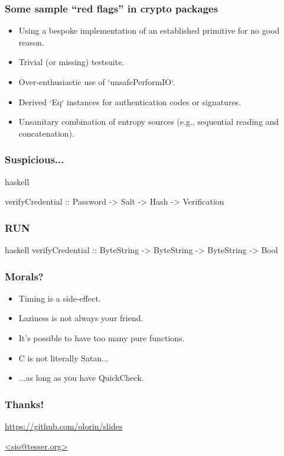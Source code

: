 \documentclass{beamer}
\begin{document}
\begin{frame}[fragile]
\frametitle{Some sample ``red flags'' in crypto packages}

\begin{itemize}
\item Using a bespoke implementation of an established primitive for
  no good reason.
\item Trivial (or missing) testsuite.
\item Over-enthusiastic use of `unsafePerformIO`.
\item Derived `Eq` instances for authentication codes or signatures.
\item Unsanitary combination of entropy sources (e.g., sequential
  reading and concatenation).
\end{itemize}

\end{frame}

\begin{frame}[fragile]
\frametitle{Suspicious...}

\centering
\begin{cminted}[mathescape]{haskell}

verifyCredential
  :: Password
  -> Salt
  -> Hash
  -> Verification
\end{cminted}

\end{frame}

\begin{frame}[fragile]
\frametitle{RUN}

\centering
\begin{cminted}[mathescape]{haskell}
verifyCredential
  :: ByteString
  -> ByteString
  -> ByteString
  -> Bool
\end{cminted}

\end{frame}


\begin{frame}

\frametitle{Morals?}

\begin{itemize}

  \item Timing is a side-effect.
  \item Laziness is not always your friend.
  \item It's possible to have too many pure functions.
  \item C is not literally Satan...
  \item ...as long as you have QuickCheck.

\end{itemize}

\end{frame}


\begin{frame}
  \frametitle{Thanks!}


  \centering
  \url{https://github.com/olorin/slides}

  \url{<sio@tesser.org>}
\end{frame}
\end{document}
